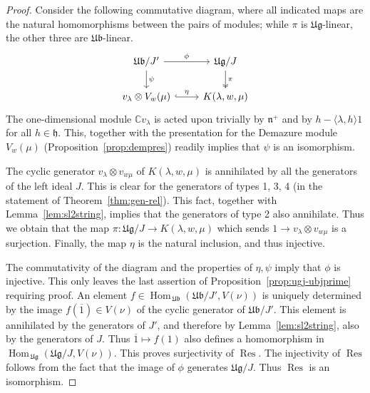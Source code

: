 \documentclass[12pt,reqno]{amsart}
\theoremstyle{plain}
\theoremstyle{definition}
\theoremstyle{remark}
\theoremstyle{plain}
\DeclareMathOperator{\Res}{Res}
\DeclareMathOperator{\Hom}{Hom}
\begin{document}
\begin{proof}
Consider the following commutative diagram, where all indicated maps are the natural homomorphisms between the pairs of modules; while $\pi$ is $\mathfrak{Ug}$-linear, the other three are $\mathfrak{Ub}$-linear.
$$ \begin{tikzcd}
\mathfrak{Ub}/J' \arrow[r, "\phi"] \arrow[d, "\psi" ]
& \mathfrak{Ug}/J \arrow[d, two heads, "\pi"] \\
v_\lambda \otimes V_w(\mu) \arrow[r, hook, "\eta"]
&  K(\lambda,w,\mu)
\end{tikzcd}
$$   
The one-dimensional module $\mathbb{C} v_\lambda$ is acted upon trivially by $\mathfrak{n}^+$ and by $h - \langle \lambda, h \rangle 1$ for all $h \in \mathfrak{h}$. This, together with the presentation for the Demazure module $V_w(\mu)$ (Proposition~\ref{prop:dempres}) readily implies that $\psi$ is an isomorphism. 

The cyclic generator $v_\lambda \otimes v_{w\mu}$ of $K(\lambda,w,\mu)$ is annihilated by all the generators of the left ideal $J$. This is clear for the generators of types 1, 3, 4 (in the statement of Theorem~\ref{thm:gen-rel}). This fact, together with Lemma~\ref{lem:sl2string}, implies that the generators of type 2 also annihilate. Thus we obtain that the map $\pi: \mathfrak{Ug}/J \to K(\lambda,w,\mu)$ which sends $1 \to v_\lambda \otimes v_{w\mu}$ is a surjection. 
Finally, the map $\eta$ is the natural inclusion, and thus injective. 

The commutativity of the diagram and the properties of $\eta, \psi$ imply that $\phi$ is injective. This only leaves the last assertion of Proposition~\ref{prop:ugj-ubjprime} requiring proof.
An element $f \in \Hom_{\,\mathfrak{Ub}} (\mathfrak{Ub}/J', V(\nu))$ is uniquely determined by the image $f(\overline{1}) \in V(\nu)$ of the cyclic generator of $\mathfrak{Ub}/J'$. This element is annihilated by the generators of $J'$, and therefore by Lemma~\ref{lem:sl2string}, also by the generators of $J$. Thus $\overline{1} \mapsto f(1)$ also defines a homomorphism in $\Hom_{\,\mathfrak{Ug}} (\mathfrak{Ug}/J, V(\nu))$. This proves surjectivity of $\Res$. The injectivity of $\Res$ follows from the fact that the image of $\phi$ generates $\mathfrak{Ug}/J$. 
Thus $\Res$ is an isomorphism.
\end{proof}
\end{document}

